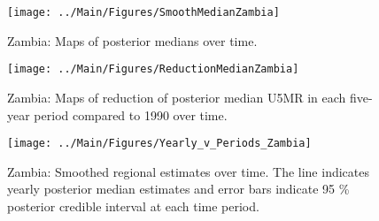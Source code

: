 \documentclass[12pt]{article}\usepackage[]{graphicx}\usepackage[]{color}
\newenvironment{knitrout}{}{} %
\begin{document}
\begin{knitrout}
\color{fgcolor}\begin{figure}[bht]

{\centering \texttt{[image: ../Main/Figures/SmoothMedianZambia]} 

}

\caption[Zambia]{Zambia: Maps of posterior medians over time.}\label{fig:unnamed-chunk-334}
\end{figure}


\end{knitrout}
\begin{knitrout}
\color{fgcolor}\begin{figure}[bht]

{\centering \texttt{[image: ../Main/Figures/ReductionMedianZambia]} 

}

\caption[Zambia]{Zambia: Maps of reduction of posterior median U5MR in each five-year period compared to 1990 over time.}\label{fig:unnamed-chunk-335}
\end{figure}


\end{knitrout}
\begin{knitrout}
\color{fgcolor}\begin{figure}[bht]

{\centering \texttt{[image: ../Main/Figures/Yearly\_v\_Periods\_Zambia]} 

}

\caption[Zambia]{Zambia: Smoothed regional estimates over time. The line indicates yearly posterior median estimates and error bars indicate 95 \% posterior credible interval at each time period.}\label{fig:unnamed-chunk-336}
\end{figure}


\end{knitrout}
\end{document}
